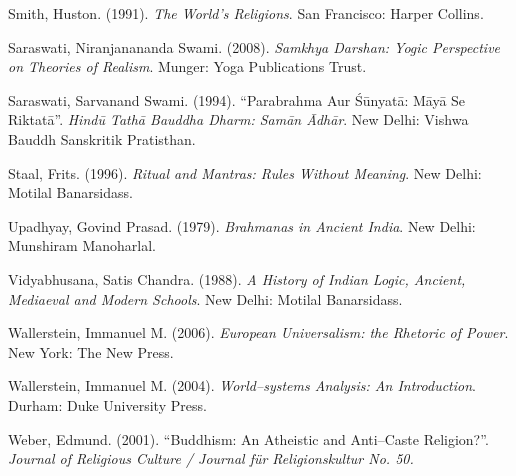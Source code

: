 \begin{thebibliography}{99}
  Smith, Huston. (1991). \textit{The World’s Religions}. San Francisco: Harper Collins.

  Saraswati, Niranjanananda Swami. (2008). \textit{Samkhya Darshan: Yogic Perspective on Theories of Realism}. Munger: Yoga Publications Trust.

  Saraswati, Sarvanand Swami. (1994). “Parabrahma Aur Śūnyatā: Māyā Se Riktatā”. \textit{Hindū Tathā Bauddha Dharm: Samān Ādhār}. New Delhi: Vishwa Bauddh Sanskritik Pratisthan.

  Staal, Frits. (1996). \textit{Ritual and Mantras: Rules Without Meaning}. New Delhi: Motilal Banarsidass.

  Upadhyay, Govind Prasad. (1979). \textit{Brahmanas in Ancient India}. New Delhi: Munshiram Manoharlal.

  Vidyabhusana, Satis Chandra. (1988). \textit{A History of Indian Logic, Ancient, Mediaeval and Modern Schools}. New Delhi: Motilal Banarsidass.

  Wallerstein, Immanuel M. (2006). \textit{European Universalism: the Rhetoric of Power}. New York: The New Press.

  Wallerstein, Immanuel M. (2004). \textit{World–systems Analysis: An Introduction}. Durham: Duke University Press.

  Weber, Edmund. (2001). “Buddhism: An Atheistic and Anti–Caste Religion?”. \textit{Journal of Religious Culture / Journal für Religionskultur No. 50.}

 \end{thebibliography}

